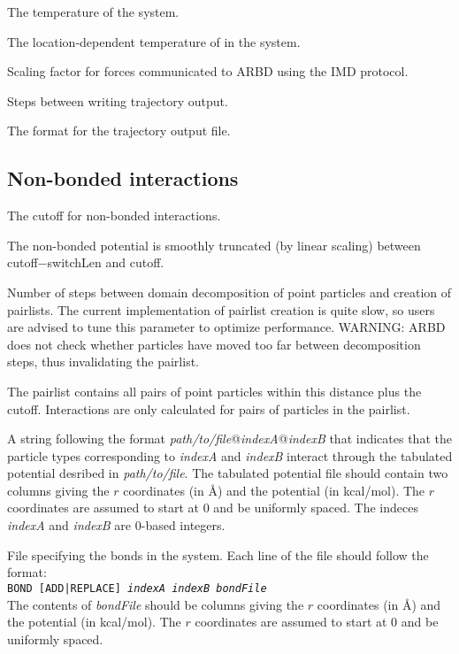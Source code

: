 \documentclass[10pt]{article}
\newcommand{\code}[1]{\texttt{#1}}
\begin{document}
{The temperature of the system.}

{The location-dependent temperature of in the system.}

{Scaling factor for forces communicated to ARBD using the IMD protocol.}

{Steps between writing trajectory output.}

{The format for the trajectory output file.}

\subsection{Non-bonded interactions}
{The cutoff for non-bonded interactions.}

{The non-bonded potential is smoothly truncated (by linear scaling) between cutoff$-$switchLen and cutoff.}

{Number of steps between domain decomposition of point particles and creation of pairlists. The current implementation of pairlist creation is quite slow, so users are advised to tune this parameter to optimize performance. WARNING: ARBD does not check whether particles have moved too far between decomposition steps, thus invalidating the pairlist.}

{The pairlist contains all pairs of point particles within this distance plus the cutoff. Interactions are only calculated for pairs of particles in the pairlist.}


{A string following the format \textit{path/to/file}@\textit{indexA}@\textit{indexB} that indicates that the particle types corresponding to \textit{indexA} and \textit{indexB} interact through the tabulated potential desribed in \textit{path/to/file}. 
The tabulated potential file should contain two columns giving the $r$ coordinates (in \AA) and the potential (in kcal/mol).
The $r$ coordinates are assumed to start at 0 and be uniformly spaced. 
The indeces \textit{indexA} and \textit{indexB} are 0-based integers.}

{File specifying the bonds in the system.
Each line of the file should follow the format: \\\noindent
\code{BOND [ADD|REPLACE] \textit{indexA} \textit{indexB} \textit{bondFile}} \\\noindent
The contents of \textit{bondFile} should be columns giving the $r$ coordinates (in \AA) and the potential (in kcal/mol).
The $r$ coordinates are assumed to start at 0 and be uniformly spaced. 
}
\end{document}

